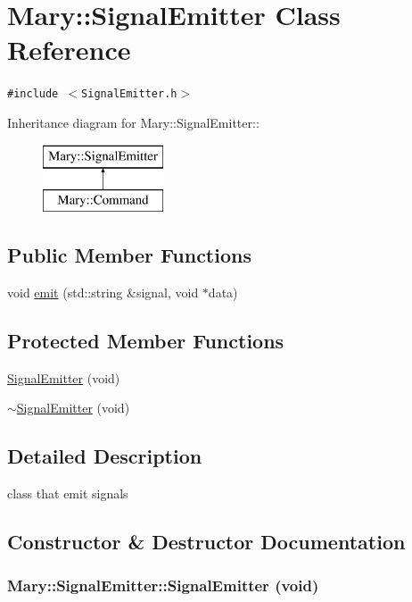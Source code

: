 \hypertarget{class_mary_1_1_signal_emitter}{
\section{Mary::SignalEmitter Class Reference}
\label{class_mary_1_1_signal_emitter}
}
{\tt \#include $<$SignalEmitter.h$>$}

Inheritance diagram for Mary::SignalEmitter::\begin{figure}[H]
\begin{center}
\leavevmode
\includegraphics[height=2cm]{class_mary_1_1_signal_emitter}
\end{center}
\end{figure}
\subsection*{Public Member Functions}
\begin{CompactItemize}
\item 
void \hyperlink{class_mary_1_1_signal_emitter_4a78be0e66cacd7d54e2524409468101}{emit} (std::string \&signal, void $\ast$data)
\end{CompactItemize}
\subsection*{Protected Member Functions}
\begin{CompactItemize}
\item 
\hyperlink{class_mary_1_1_signal_emitter_b7e5a988192dd235d794a8dae3a7cd52}{SignalEmitter} (void)
\item 
\hyperlink{class_mary_1_1_signal_emitter_2131ac1aaef12758a313b53e69752df9}{$\sim$SignalEmitter} (void)
\end{CompactItemize}


\subsection{Detailed Description}
class that emit signals 

\subsection{Constructor \& Destructor Documentation}
\hypertarget{class_mary_1_1_signal_emitter_b7e5a988192dd235d794a8dae3a7cd52}{
\subsubsection[SignalEmitter]{\setlength{\rightskip}{0pt plus 5cm}Mary::SignalEmitter::SignalEmitter (void)}}
\label{class_mary_1_1_signal_emitter_b7e5a988192dd235d794a8dae3a7cd52}


